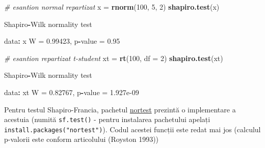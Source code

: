 \documentclass[]{article}
\newenvironment{Shaded}{\begin{snugshade}}{\end{snugshade}}
\newcommand{\KeywordTok}[1]{\textcolor[rgb]{0.13,0.29,0.53}{\textbf{#1}}}
\newcommand{\DataTypeTok}[1]{\textcolor[rgb]{0.13,0.29,0.53}{#1}}
\newcommand{\DecValTok}[1]{\textcolor[rgb]{0.00,0.00,0.81}{#1}}
\newcommand{\FloatTok}[1]{\textcolor[rgb]{0.00,0.00,0.81}{#1}}
\newcommand{\StringTok}[1]{\textcolor[rgb]{0.31,0.60,0.02}{#1}}
\newcommand{\CommentTok}[1]{\textcolor[rgb]{0.56,0.35,0.01}{\textit{#1}}}
\newcommand{\OperatorTok}[1]{\textcolor[rgb]{0.81,0.36,0.00}{\textbf{#1}}}
\newcommand{\NormalTok}[1]{#1}
\begin{document}
\begin{Shaded}
\begin{Highlighting}[]
\CommentTok{# esantion normal repartizat }
\NormalTok{x =}\StringTok{ }\KeywordTok{rnorm}\NormalTok{(}\DecValTok{100}\NormalTok{, }\DecValTok{5}\NormalTok{, }\DecValTok{2}\NormalTok{)}
\KeywordTok{shapiro.test}\NormalTok{(x)}

\NormalTok{    Shapiro}\OperatorTok{-}\NormalTok{Wilk normality test}

\NormalTok{data}\OperatorTok{:}\StringTok{  }\NormalTok{x}
\NormalTok{W =}\StringTok{ }\FloatTok{0.99423}\NormalTok{, p}\OperatorTok{-}\NormalTok{value =}\StringTok{ }\FloatTok{0.95}

\CommentTok{# esantion repartizat t-student}
\NormalTok{xt =}\StringTok{ }\KeywordTok{rt}\NormalTok{(}\DecValTok{100}\NormalTok{, }\DataTypeTok{df =} \DecValTok{2}\NormalTok{)}
\KeywordTok{shapiro.test}\NormalTok{(xt)}

\NormalTok{    Shapiro}\OperatorTok{-}\NormalTok{Wilk normality test}

\NormalTok{data}\OperatorTok{:}\StringTok{  }\NormalTok{xt}
\NormalTok{W =}\StringTok{ }\FloatTok{0.82767}\NormalTok{, p}\OperatorTok{-}\NormalTok{value =}\StringTok{ }\FloatTok{1.927e-09}
\end{Highlighting}
\end{Shaded}

Pentru testul Shapiro-Francia, pachetul
\href{https://cran.r-project.org/web/packages/nortest/}{nortest}
prezintă o implementare a acestuia (numită \texttt{sf.test()} - pentru
instalarea pachetului apelați \texttt{install.packages("nortest")}).
Codul acestei funcții este redat mai jos (calculul p-valorii este
conform articolului (Royston 1993))
\end{document}
